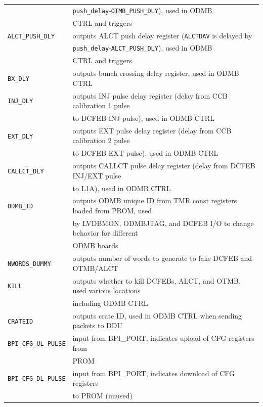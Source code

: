 \documentclass[10pt,a4paper]{article}
\begin{document}
\begin{table}[H]
\begin{tabular}{|l|l|}
                        & \texttt{push\_delay}-\texttt{OTMB\_PUSH\_DLY}), used in ODMB \\
												& CTRL and triggers\\ \hline
\texttt{ALCT\_PUSH\_DLY}& outputs ALCT push delay register (\texttt{ALCTDAV} is delayed by  \\
                        & \texttt{push\_delay}-\texttt{ALCT\_PUSH\_DLY}), used in ODMB \\
												& CTRL and triggers\\ \hline
\texttt{BX\_DLY}& outputs bunch crossing delay register, used in ODMB CTRL\\ \hline
\texttt{INJ\_DLY}& outputs INJ pulse delay register (delay from CCB calibration 1 pulse \\
                 & to DCFEB INJ pulse), used in ODMB CTRL\\ \hline
\texttt{EXT\_DLY}& outputs EXT pulse delay register (delay from CCB calibration 2 pulse \\
                 & to DCFEB EXT pulse), used in ODMB CTRL\\ \hline
\texttt{CALLCT\_DLY}& outputs CALLCT pulse delay register (delay from DCFEB INJ/EXT pulse \\
                 & to L1A), used in ODMB CTRL\\ \hline
\texttt{ODMB\_ID}& outputs ODMB unique ID from TMR const registers loaded from PROM, used \\
                 & by LVDBMON, ODMBJTAG, and DCFEB I/O to change behavior for different \\
								 & ODMB boards \\ \hline
\texttt{NWORDS\_DUMMY}& outputs number of words to generate to fake DCFEB and OTMB/ALCT\\ \hline
\texttt{KILL}& outputs whether to kill DCFEBs, ALCT, and OTMB, used various locations \\
             & including ODMB CTRL\\ \hline
\texttt{CRATEID}& outputs crate ID, used in ODMB CTRL when sending packets to DDU\\ \hline
\texttt{BPI\_CFG\_UL\_PULSE}& input from BPI\_PORT, indicates upload of CFG registers from\\
                            & PROM\\ \hline
\texttt{BPI\_CFG\_DL\_PULSE}& input from BPI\_PORT, indicates download of CFG registers \\
                            & to PROM (unused)\\ \hline

\end{tabular}
\end{table}
\end{document}
